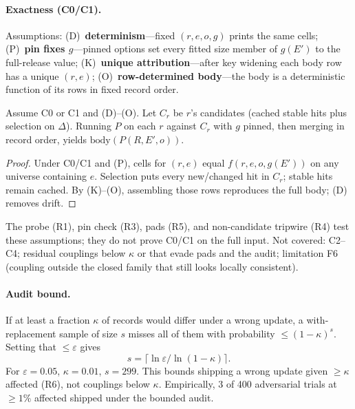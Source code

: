 \paragraph{Exactness (C0/C1).}
\label{asm:det}\label{asm:pin}\label{asm:key}\label{asm:order}%
Assumptions: (D)~\textbf{determinism}---fixed $(r,e,o,g)$ prints the same cells;
(P)~\textbf{pin fixes $g$}---pinned options set every fitted size member of
$g(E')$ to the full-release value; (K)~\textbf{unique attribution}---after key
widening each body row has a unique $(r,e)$; (O)~\textbf{row-determined
body}---the body is a deterministic function of its rows in fixed record order.
\begin{proposition}\label{prop:exact}
Assume C0 or C1 and (D)--(O). Let $C_r$ be $r$'s candidates (cached stable hits
plus selection on $\Delta$). Running $P$ on each $r$ against $C_r$ with $g$
pinned, then merging in record order, yields $\mathrm{body}(P(R,E',o))$.
\end{proposition}
\begin{proof}
Under C0/C1 and (P), cells for $(r,e)$ equal $f(r,e,o,g(E'))$ on any universe
containing $e$. Selection puts every new/changed hit in $C_r$; stable hits remain
cached. By (K)--(O), assembling those rows reproduces the full body; (D) removes
drift.
\end{proof}
The probe (R1), pin check (R3), pads (R5), and non-candidate tripwire (R4) test
these assumptions; they do not prove C0/C1 on the full input. Not covered:
C2--C4; residual couplings below $\kappa$ or that evade pads and the audit;
limitation F6 (coupling outside the closed family that still looks locally
consistent).

\paragraph{Audit bound.}
If at least a fraction $\kappa$ of records would differ under a wrong update, a
with-replacement sample of size $s$ misses all of them with probability
$\le(1-\kappa)^s$. Setting that $\le\varepsilon$ gives
\begin{equation}
s=\bigl\lceil\ln\varepsilon/\ln(1-\kappa)\bigr\rceil.
\label{eq:audit-s}
\end{equation}
For $\varepsilon=0.05$, $\kappa=0.01$, $s=299$. This bounds shipping a wrong
update given $\ge\kappa$ affected (R6), not couplings below $\kappa$. Empirically,
3 of 400 adversarial trials at $\ge 1\%$ affected shipped under the bounded audit.

